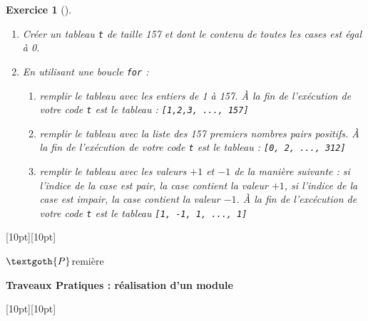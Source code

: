 \documentclass[12pt]{article}                   %
\newcounter{exoscount}
\theoremstyle{exercicestyle}
\newtheorem{exos}[exoscount]{Exercice}
\newenvironment{exo}[2]
  {
   \begin{exos}[#1]
   \leavevmode
   \marginpar{\hfill $#2 $ }}
  {\end{exos}}
\theoremstyle{break2}
\theoremstyle{break3}
\begin{document}
\begin{exo}{}{  }
    \begin{enumerate}
        \item Créer un tableau \texttt{t} de taille 157 et dont le contenu de toutes les cases est égal à 0.
        \item En utilisant une boucle \texttt{for} :
            \begin{enumerate}
                \item remplir le tableau avec les entiers de 1 à 157. À la fin de l'exécution de votre code \texttt{t} est le tableau :
                        \texttt{[1,2,3, ..., 157]}
                \item remplir le tableau avec la liste des 157 premiers nombres pairs positifs. À la fin de l'exécution de votre code \texttt{t} est le tableau :
                    \texttt{[0, 2, ..., 312]}
                \item remplir le tableau avec les valeurs $+1$ et $-1$ de la manière suivante : si l'indice de la case est pair, la case contient la valeur $+1$, si l'indice de la case est impair, la case contient la valeur $-1$. À la fin de l'excécution de votre code \texttt{t} est le tableau \texttt{[1, -1, 1, ..., 1]}
            \end{enumerate}
    \end{enumerate}
\end{exo} 

\pagebreak 


\noindent\hrulefill
\raisebox{-2.1pt}[10pt][10pt]{\quad\decoone\quad}\hrulefill 

\hfill $\textgoth{P}$remière
 \begin{center}{\quad \large{\textbf{ Traveaux Pratiques : réalisation d'un module }}\; }\end{center}
\vspace{0.5cm}
\noindent
\hrulefill
\raisebox{-16.4pt}[10pt][10pt]{}\hrulefill
\vspace{1cm}
\end{document}
